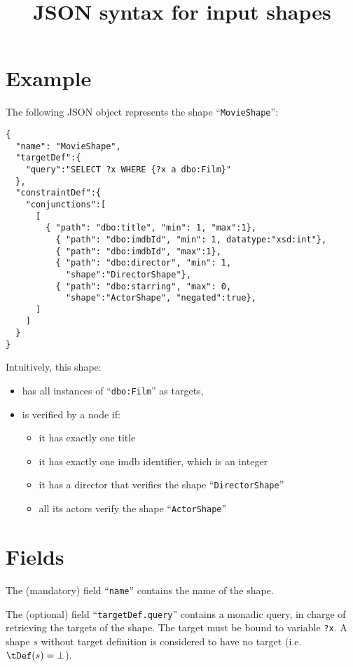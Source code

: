 \documentclass[]{article}
\newcommand{\exFont}[1]{\texttt{{\small #1}}}
\begin{document}
\title{JSON syntax for input \shacl shapes}
\date{}
\maketitle

\section{Example}


The following JSON object represents the shape ``\exFont{MovieShape}'':
\begin{Verbatim}[frame=single]
{
  "name": "MovieShape",
  "targetDef":{
    "query":"SELECT ?x WHERE {?x a dbo:Film}"
  },
  "constraintDef":{
    "conjunctions":[
      [ 	
        { "path": "dbo:title", "min": 1, "max":1},
          { "path": "dbo:imdbId", "min": 1, datatype:"xsd:int"},
          { "path": "dbo:imdbId", "max":1},
          { "path": "dbo:director", "min": 1,
            "shape":"DirectorShape"},
          { "path": "dbo:starring", "max": 0,
            "shape":"ActorShape", "negated":true},
      ]
    ]
  }
}
\end{Verbatim}

Intuitively, this shape:
\begin{itemize}
\item has all instances of ``\exFont{dbo:Film}'' as targets,
\item is verified by a node if:
\begin{itemize}
\item it has exactly one title
\item it has exactly one imdb identifier, which is an integer
\item it has a director that verifies the shape ``\exFont{DirectorShape}''
\item all its actors verify the shape ``\exFont{ActorShape}''
\end{itemize}
\end{itemize}



\section{Fields}



The (mandatory) field ``\exFont{name}'' contains the name of the shape.

The (optional) field ``\exFont{targetDef.query}'' contains a monadic \sparql query,
in charge of retrieving the targets of the shape.
The target must be bound to variable \exFont{?x}.
A shape $s$ without target definition is considered to have no target (i.e. $\tDef(s) = \bot$).
\end{document}

